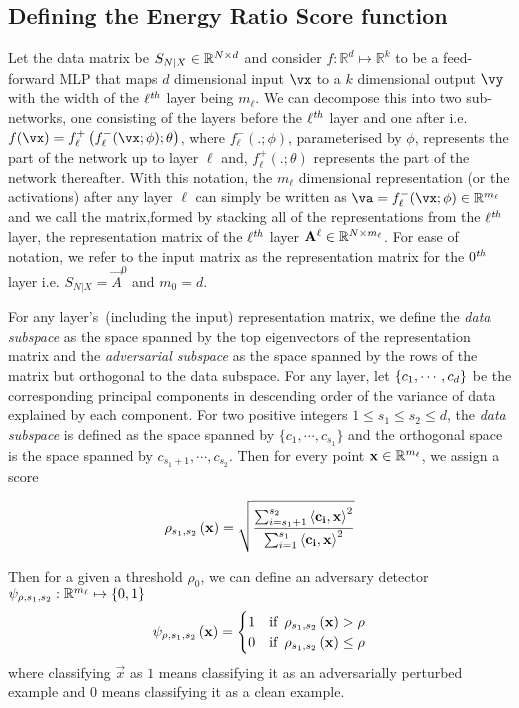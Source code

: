 \subsection{Defining the Energy Ratio Score function}
Let the data matrix be \(S_{N\vert X}\in\mathbb{R}^{N\times d}\) and consider $f:
\mathbb{R}^d \mapsto \mathbb{R}^k$ to be a feed-forward MLP that maps $d$
dimensional input $\vx$ to a $k$ dimensional output $\vy$ with the width of the
\(\ell^{\it th}\) layer being \(m_\ell\). We can decompose this into two
sub-networks, one consisting of the layers before the $\ell^{\it th}$ layer and
one after i.e.  $f(\vx) = f^{+}_\ell\br{f^{-}_\ell(\vx; \phi) ; \theta}$, where
$f^{-}_\ell (.;\phi)$, parameterised by $\phi$, represents the part of the
network up to layer $\ell$ and, $f^{+}_\ell(.;\theta)$ represents the part of
the network thereafter. With this notation, the $m_\ell$ dimensional
representation (or the activations) after any layer $\ell$ can simply be written
as $\va = f^{-}_\ell(\vx; \phi) \in \mathbb{R}^{m_\ell}$ and we call the
matrix,formed by stacking all of the representations from the \(\ell^{\it th}\)
layer, the representation  matrix of the \(\ell^{\it th}\) layer
\({\mathbf{A}}^{\ell}\in\mathbb{R}^{N\times m_\ell}\). For ease of notation, we refer to
the input matrix  as the representation matrix for the \(0^{\it th}\) layer i.e.
\(S_{N\vert X}=\vec{A}^0\) and \(m_0 = d\).

For any layer's~(including the input) representation matrix, we define the {\em
data subspace} as the space spanned by the top eigenvectors of the
representation matrix and the {\em adversarial subspace} as the space spanned by
the rows of the matrix but orthogonal to the data subspace. For any layer, let
\(\left\{{c_1,\cdots,c_d}\right\}\) be the corresponding principal components in descending
order of the variance of data explained by each component. For two positive
integers \(1\le s_1\le s_2\le d\), the {\em data subspace} is defined as the
space spanned by \(\{c_1,\cdots,c_{s_1}\}\) and the orthogonal space is the
space spanned by \(c_{s_1+1},\cdots,c_{s_2}\). Then for every point
\({\mathbf{x}}\in\mathbb{R}^{m_\ell}\), we assign a score 


\begin{equation}\label{eq:energy-ratio-score-fn}
  \rho_{s_1,s_2}\left({{\mathbf{x}}}\right) = \sqrt{\dfrac{\sum_{i=s_1+1}^{s_2}\left\langle{{\mathbf{c_i}}},{{\mathbf{x}}}\right\rangle^2}{ \sum_{i=1}^{s_1} \left\langle{{\mathbf{c_i}}},{{\mathbf{x}}}\right\rangle^2}}
\end{equation}

Then for a given a threshold \(\rho_0\), we can define an adversary detector
\(\psi_{\rho,s_1,s_2}:\mathbb{R}^{m_\ell}\mapsto \left\{{0,1}\right\}\)
\[ \psi_{\rho,s_1,s_2}\left({{\mathbf{x}}}\right) = \begin{cases} \label{eq:detector-fn}
  1 & \text{if}\enskip \rho_{s_1,s_2}\left({{\mathbf{x}}}\right)  >\rho \\
  0  & \text{if}\enskip  \rho_{s_1,s_2}\left({{\mathbf{x}}}\right)  \le \rho
\end{cases}
\]
 where classifying \(\vec{x}\) as \(1\) means classifying it as an adversarially perturbed example and \(0\) means classifying it as a clean example.


 